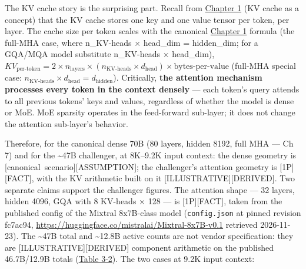 The KV cache story is the surprising part. Recall from \hyperref[chap:1]{Chapter 1} (KV
cache as a concept) that the KV cache stores one key and one value
tensor per token, per layer. The cache size per token scales with the
canonical \hyperref[chap:1]{Chapter 1} formula (the full-MHA case, where n\_KV-heads ×
head\_dim = hidden\_dim; for a GQA/MQA model substitute n\_KV-heads ×
head\_dim),
\(KV_{\text{per-token}} = 2 \times n_{\text{layers}} \times (n_{\text{KV-heads}} \times d_{\text{head}}) \times \text{bytes-per-value}\)
(full-MHA special case:
\(n_{\text{KV-heads}} \times d_{\text{head}} = d_{\text{hidden}}\)).
Critically, \textbf{the attention mechanism processes every token in the
context densely} --- each token's query attends to all previous tokens'
keys and values, regardless of whether the model is dense or MoE. MoE
sparsity operates in the feed-forward sub-layer; it does not change the
attention sub-layer's behavior.

Therefore, for the canonical dense 70B (80 layers, hidden 8192, full MHA
--- Ch 7) and for the \textasciitilde47B challenger, at 8K--9.2K input
context: the dense geometry is \mbox{{[}canonical scenario{]}}\hspace{0pt}\mbox{{[}ASSUMPTION{]}};
the challenger's attention geometry is \mbox{{[}1P{]}}\hspace{0pt}\mbox{{[}FACT{]}}, with the KV
arithmetic built on it \mbox{{[}ILLUSTRATIVE{]}}\hspace{0pt}\mbox{{[}DERIVED{]}}. Two separate
claims support the challenger figures. The attention shape --- 32
layers, hidden 4096, GQA with 8 KV-heads × 128 --- is
\mbox{{[}1P{]}}\hspace{0pt}\mbox{{[}FACT{]}}, taken from the published config of the Mixtral
8x7B-class model (\texttt{config.json} at pinned revision fc7ac94,
\url{https://huggingface.co/mistralai/Mixtral-8x7B-v0.1} retrieved
2026-11-23). The \textasciitilde47B total and \textasciitilde12.8B
active counts are not vendor specification: they are
\mbox{{[}ILLUSTRATIVE{]}}\hspace{0pt}\mbox{{[}DERIVED{]}} component arithmetic on the published
46.7B/12.9B totals (\hyperref[tab:3.2]{Table 3-2}). The two cases at 9.2K input context:

